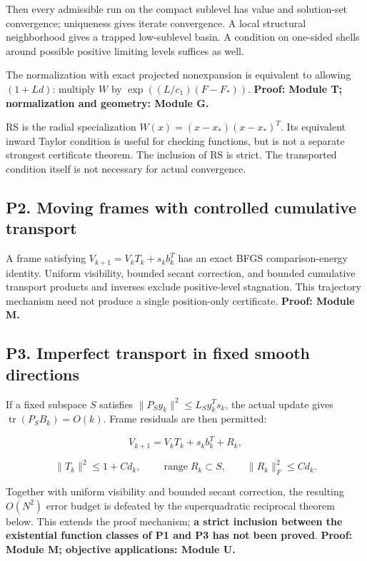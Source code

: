 Then every admissible run on the compact sublevel has value and solution-set convergence; uniqueness gives iterate convergence. A local structural neighborhood gives a trapped low-sublevel basin. A condition on one-sided shells around possible positive limiting levels suffices as well.

The normalization with exact projected nonexpansion is equivalent to allowing \((1+Ld)\): multiply \(W\) by \(\exp((L/c_1)(F-F_*))\). \textbf{Proof: Module T; normalization and geometry: Module G.}

RS is the radial specialization \(W(x)=(x-x_*)(x-x_*)^T\). Its equivalent inward Taylor condition is useful for checking functions, but is not a separate strongest certificate theorem. The inclusion of RS is strict. The transported condition itself is not necessary for actual convergence.

\subsection{P2. Moving frames with controlled cumulative transport}\label{p2.-moving-frames-with-controlled-cumulative-transport}

A frame satisfying \(V_{k+1}=V_kT_k+s_kb_k^T\) has an exact BFGS comparison-energy identity. Uniform visibility, bounded secant correction, and bounded cumulative transport products and inverses exclude positive-level stagnation. This trajectory mechanism need not produce a single position-only certificate. \textbf{Proof: Module M.}

\subsection{P3. Imperfect transport in fixed smooth directions}\label{p3.-imperfect-transport-in-fixed-smooth-directions}

If a fixed subspace \(S\) satisfies \(\|P_Sy_k\|^2\le L_Sy_k^Ts_k\), the actual update gives \(\operatorname{tr}(P_SB_k)=O(k)\). Frame residuals are then permitted:

\[V_{k+1}=V_kT_k+s_kb_k^T+R_k,\]

\[\|T_k\|^2\le1+Cd_k,\qquad \operatorname{range}R_k\subset S,
\qquad\|R_k\|_F^2\le Cd_k.\]

Together with uniform visibility and bounded secant correction, the resulting \(O(N^2)\) error budget is defeated by the superquadratic reciprocal theorem below. This extends the proof mechanism; \textbf{a strict inclusion between the existential function classes of P1 and P3 has not been proved}. \textbf{Proof: Module M; objective applications: Module U.}

